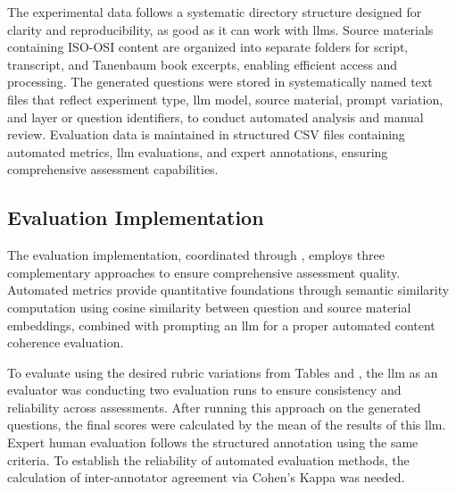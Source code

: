 The experimental data follows a systematic directory structure designed for clarity and reproducibility, as good as it can work with \ac{llms}. Source materials containing ISO-OSI content are organized into separate folders for script, transcript, and Tanenbaum book excerpts, enabling efficient access and processing. The generated questions were stored in systematically named text files that reflect experiment type, \ac{llm} model, source material, prompt variation, and layer or question identifiers, to conduct automated analysis and manual review. Evaluation data is maintained in structured CSV files containing automated metrics, \ac{llm} evaluations, and expert annotations, ensuring comprehensive assessment capabilities.

\subsection{Evaluation Implementation}

The evaluation implementation, coordinated through , employs three complementary approaches to ensure comprehensive assessment quality. Automated metrics provide quantitative foundations through semantic similarity computation using cosine similarity between question and source material embeddings, combined with prompting an \ac{llm} for a proper automated content coherence evaluation. 

\pagebreak

To evaluate using the desired rubric variations from Tables  and , the \ac{llm} as an evaluator was conducting two evaluation runs to ensure consistency and reliability across assessments. After running this approach on the generated questions, the final scores were calculated by the mean of the results of this \ac{llm}. Expert human evaluation follows the structured annotation using the same criteria. To establish the reliability of automated evaluation methods, the calculation of inter-annotator agreement via Cohen's Kappa was needed. 


